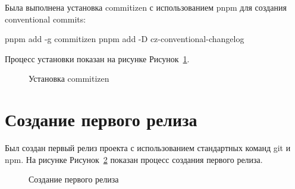 \documentclass[
  12pt,
  a4paper,
  DIV=11,
  numbers=noendperiod]{scrreprt}
\newenvironment{Shaded}{\begin{snugshade}}{\end{snugshade}}
\newcommand{\AttributeTok}[1]{\textcolor[rgb]{0.40,0.45,0.13}{#1}}
\newcommand{\ExtensionTok}[1]{\textcolor[rgb]{0.00,0.23,0.31}{#1}}
\newcommand{\NormalTok}[1]{\textcolor[rgb]{0.00,0.23,0.31}{#1}}
\begin{document}
Была выполнена установка commitizen с использованием pnpm для создания
conventional commits:

\begin{Shaded}
\begin{Highlighting}[]
\ExtensionTok{pnpm}\NormalTok{ add }\AttributeTok{{-}g}\NormalTok{ commitizen}
\ExtensionTok{pnpm}\NormalTok{ add }\AttributeTok{{-}D}\NormalTok{ cz{-}conventional{-}changelog}
\end{Highlighting}
\end{Shaded}

Процесс установки показан на рисунке Рисунок~\ref{fig-commitzen}.

\begin{figure}


\caption{\label{fig-commitzen}Установка commitizen}

\end{figure}%

\section{Создание первого
релиза}\label{ux441ux43eux437ux434ux430ux43dux438ux435-ux43fux435ux440ux432ux43eux433ux43e-ux440ux435ux43bux438ux437ux430}

Был создан первый релиз проекта с использованием стандартных команд git
и npm. На рисунке Рисунок~\ref{fig-release} показан процесс создания
первого релиза.

\begin{figure}


\caption{\label{fig-release}Создание первого релиза}

\end{figure}%
\end{document}
